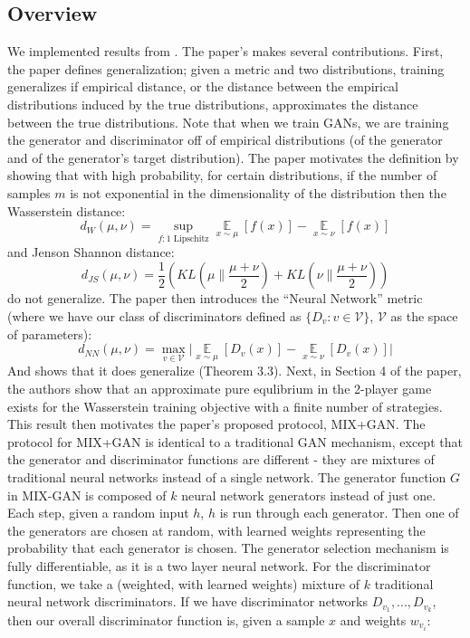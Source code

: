\documentclass{article}
\newcommand*\bb[1]{\mathbb{#1}}
\newcommand*\cc[1]{\mathcal{#1}}
\begin{document}
\subsection{Overview}
We implemented results from \cite{Arora17}. The paper's makes several contributions. First, the paper defines generalization; given a metric and two distributions, training generalizes if empirical distance, or the distance between the empirical distributions induced by the true distributions, approximates the distance between the true distributions. Note that when we train GANs, we are training the generator and discriminator off of empirical distributions (of the generator and of the generator's target distribution). The paper motivates the definition by showing that with high probability, for certain distributions, if the number of samples $m$ is not exponential in the dimensionality of the distribution then the Wasserstein distance:
\[
  d_W(\mu, \nu) = \sup\limits_{f : 1 \mbox{ Lipschitz} } \mathop{\bb{E}}\limits_{x \sim \mu}[f(x)] - \mathop{\bb{E}}\limits_{x \sim \nu} [f(x)]
\]
 and Jenson Shannon distance:
\[
  d_{JS}(\mu, \nu) = \frac{1}{2}(KL(\mu \| \frac{\mu+\nu}{2}) + KL(\nu \| \frac{\mu+\nu}{2}))
\]
do not generalize. The paper then introduces the ``Neural Network'' metric (where we have our class of discriminators defined as $\{D_v : v \in \cc{V}\}$, $\cc{V}$ as the space of parameters):
\[
  d_{NN}(\mu, \nu) = \max\limits_{v \in \cc{V}} \vert \mathop{\bb{E}}\limits_{x \sim \mu}[D_v(x)] - \mathop{\bb{E}}\limits_{x \sim \nu}[D_v(x)] \vert
\]
And shows that it does generalize (Theorem $3.3$). Next, in Section 4 of the paper, the authors show that an approximate pure equlibrium in the 2-player game exists for the Wasserstein training objective with a finite number of strategies. This result then motivates the paper's proposed protocol, MIX+GAN. The protocol for MIX+GAN is identical to a traditional GAN mechanism, except that the generator and discriminator functions are different - they are mixtures of traditional neural networks instead of a single network. The generator function $G$ in MIX-GAN is composed of $k$ neural network generators instead of just one. Each step, given a random input $h$, $h$ is run through each generator. Then one of the generators are chosen at random, with learned weights representing the probability that each generator is chosen. The generator selection mechanism is fully differentiable, as it is a two layer neural network. For the discriminator function, we take a (weighted, with learned weights) mixture of $k$ traditional neural network discriminators. If we have discriminator networks $D_{v_1},...,D_{v_k}$, then our overall discriminator function is, given a sample $x$ and weights $w_{v_i}$:
\end{document}
